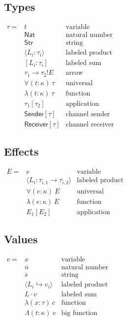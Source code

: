 \documentclass[12pt]{article}
\begin{document}
\subsection{Types}

$\begin{array}{lll}
\tau =
  & t                            & \text{variable} \\
  & \textsf{Nat}                 & \text{natural number} \\
  & \textsf{Str}                 & \text{string} \\
  & \langle L_i : \tau_i \rangle & \text{labeled product} \\
  & [ L_i : \tau_i ]             & \text{labeled sum} \\
  & \tau_1 \rightarrow \tau_2!E  & \text{arrow} \\
  & \forall (t : \kappa) \ \tau  & \text{universal} \\
  & \lambda (t : \kappa) \ \tau  & \text{function} \\
  & \tau_1[\tau_2]               & \text{application} \\
  & \textsf{Sender}[\tau]        & \text{channel sender} \\
  & \textsf{Receiver}[\tau]      & \text{channel receiver}
\end{array}$

\subsection{Effects}

$\begin{array}{rll}
E =
  & e                              & \text{variable} \\
  & \langle L_i : \tau_{i,1}
    \rightarrow \tau_{i,2} \rangle & \text{labeled product} \\
  & \forall (e : \kappa) \ E       & \text{universal} \\
  & \lambda (e : \kappa) \ E       & \text{function} \\
  & E_1[E_2]                       & \text{application}
\end{array}$

\subsection{Values}

$\begin{array}{rll}
v =
  & x                           & \text{variable} \\
  & \overline{n}                & \text{natural number} \\
  & \overline{s}                & \text{string} \\
  & \langle L_i
    \hookrightarrow v_i \rangle & \text{labeled product} \\
  & L \cdot v                   & \text{labeled sum} \\
  & \lambda (x : \tau) \ c      & \text{function} \\
  & \Lambda (t : \kappa) \ v    & \text{big function}
\end{array}$
\end{document}
